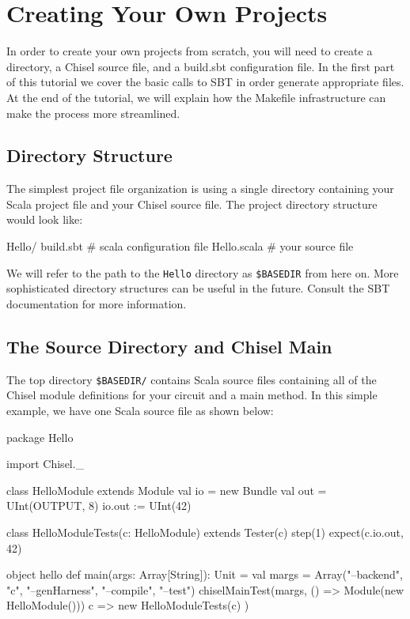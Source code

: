 \section{Creating Your Own Projects}

In order to create your own projects from scratch, you will need to create a directory, a Chisel source file, and a build.sbt configuration file. In the first part of this tutorial we cover the basic calls to SBT in order generate appropriate files. At the end of the tutorial, we will explain how the Makefile infrastructure can make the process more streamlined.

\subsection{Directory Structure}

The simplest project file organization is using a single directory containing your Scala project file and your Chisel source file.  The project directory structure would look like:

\begin{bash}
Hello/
  build.sbt   # scala configuration file
  Hello.scala # your source file
\end{bash}

We will refer to the path to the \verb+Hello+ directory as \verb+$BASEDIR+ from here on.  More sophisticated directory structures can be useful in the future.  Consult the SBT documentation for more information.

\subsection{The Source Directory and Chisel Main}

The top directory \verb+$BASEDIR/+ contains Scala source files containing all of the Chisel module definitions for your circuit and a main method.  In this simple example, we have one Scala source file as shown below:

\begin{scala}
package Hello

import Chisel._

class HelloModule extends Module {
  val io = new Bundle { 
    val out = UInt(OUTPUT, 8)
  }
  io.out := UInt(42)
}

class HelloModuleTests(c: HelloModule) 
    extends Tester(c) {
  step(1)
  expect(c.io.out, 42)
}

object hello {
  def main(args: Array[String]): Unit = {
    val margs = 
      Array("--backend", "c", "--genHarness", "--compile", "--test")
    chiselMainTest(margs, () => Module(new HelloModule())) {
        c => new HelloModuleTests(c)
      })
  }
}
\end{scala}

